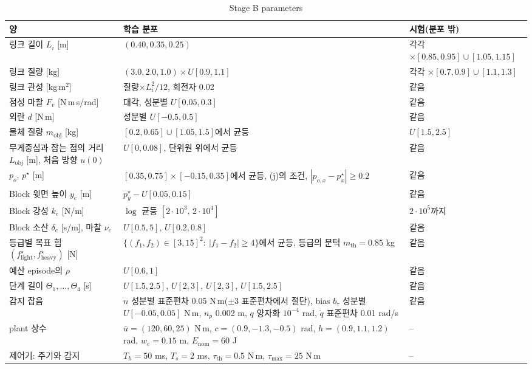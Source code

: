 \documentclass[11pt]{article}\usepackage[margin=1in]{geometry}\usepackage{amsmath,amssymb,amsthm,mathtools}\usepackage{graphicx}\graphicspath{{figures/}{../figures/}{figs/}{./}}\usepackage{enumitem}\usepackage{hyperref}\usepackage{cleveref}\usepackage{tikz}\usetikzlibrary{arrows.meta,positioning,calc,shapes.geometric}\usepackage{float}\usepackage{rotating}\usepackage[most]{tcolorbox}\usepackage{kotex}\usepackage{booktabs}\usepackage{longtable}\emergencystretch=1.6em\tolerance=2000 \crefname{assumption}{Assumption}{Assumptions}\Crefname{assumption}{Assumption}{Assumptions}\crefname{definition}{Definition}{Definitions}\Crefname{definition}{Definition}{Definitions}\crefname{proposition}{Proposition}{Propositions}\Crefname{proposition}{Proposition}{Propositions}\crefname{fact}{Fact}{Facts}\Crefname{fact}{Fact}{Facts} \newtheorem{assumption}{Assumption}\newtheorem{definition}{Definition}\newtheorem{lemma}{Lemma}\newtheorem{proposition}{Proposition}\newtheorem{theorem}{Theorem}\newtheorem{corollary}{Corollary}\newtheorem{fact}{Fact}\theoremstyle{remark}\newtheorem{remark}{Remark} \newcommand{\R}{\mathbb{R}}\newcommand{\xb}{\bar x}\newcommand{\Ab}{\bar A}\newcommand{\By}{\bar B_y}\newcommand{\U}{\mathcal U}\newcommand{\Z}{\mathcal Z}
\begin{document}
\begin{table}[H]
\centering\footnotesize
\caption{Stage B parameters}
\label{tab:stageB}
\begin{tabular}{p{3.9cm}p{6.2cm}p{4.6cm}}
\toprule
양 & 학습 분포 & 시험(분포 밖) \\
\midrule
링크 길이 $L_i$ [m] & $(0.40,0.35,0.25)$ & 각각 $\times[0.85,0.95]\cup[1.05,1.15]$ \\
링크 질량 [kg] & $(3.0,2.0,1.0)\times U[0.9,1.1]$ & 각각 $\times[0.7,0.9]\cup[1.1,1.3]$ \\
링크 관성 [kg\,m$^2$] & 질량$\times L_i^2/12$, 회전자 0.02 & 같음 \\
점성 마찰 $F_v$ [N\,m\,s/rad] & 대각, 성분별 $U[0.05,0.3]$ & 같음 \\
외란 $d$ [N\,m] & 성분별 $U[-0.5,0.5]$ & 같음 \\
물체 질량 $m_{\mathrm{obj}}$ [kg] & $[0.2,0.65]\cup[1.05,1.5]$에서 균등 & $U[1.5,2.5]$ \\
무게중심과 잡는 점의 거리 $L_{\mathrm{obj}}$ [m], 처음 방향 $u(0)$ & $U[0,0.08]$, 단위원 위에서 균등 & 같음 \\
$p_o$, $p^\star$ [m] & $[0.35,0.75]\times[-0.15,0.35]$에서 균등, (j)의 조건, $|p_{o,x}-p^\star_x|\ge0.2$ & 같음 \\
Block 윗면 높이 $y_e$ [m] & $p^\star_y-U[0.05,0.15]$ & 같음 \\
Block 강성 $k_e$ [N/m] & $\log$ 균등 $[2\cdot10^3,\,2\cdot10^4]$ & $2\cdot10^5$까지 \\
Block 소산 $\delta_e$ [s/m], 마찰 $\nu_e$ & $U[0.5,5]$, $U[0.2,0.8]$ & 같음 \\
등급별 목표 힘 $(f^\star_{\mathrm{light}},f^\star_{\mathrm{heavy}})$ [N] & $\{(f_1,f_2)\in[3,15]^2:\ |f_1-f_2|\ge4\}$에서 균등, 등급의 문턱 $m_{\mathrm{th}}=0.85$ kg & 같음 \\
예산 episode의 $\rho$ & $U[0.6,1]$ & 같음 \\
단계 길이 $\Theta_1,\dots,\Theta_4$ [s] & $U[1.5,2.5]$, $U[2,3]$, $U[2,3]$, $U[1.5,2.5]$ & 같음 \\
감지 잡음 & $n$ 성분별 표준편차 0.05 N\,m($\pm3$ 표준편차에서 절단), bias $b_\tau$ 성분별 $U[-0.05,0.05]$ N\,m, $n_p$ 0.002 m, $q$ 양자화 $10^{-4}$ rad, $\dot q$ 표준편차 0.01 rad/s & 같음 \\
plant 상수 & $\bar u=(120,60,25)$ N\,m, $c=(0.9,-1.3,-0.5)$ rad, $h=(0.9,1.1,1.2)$ rad, $w_e=0.15$ m, $E_{\mathrm{nom}}=60$ J & -- \\
제어기: 주기와 감지 & $T_h=50$ ms, $T_s=2$ ms, $\tau_{\mathrm{th}}=0.5$ N\,m, $\tau_{\max}=25$ N\,m & -- \\

\end{tabular}
\end{table}
\end{document}
